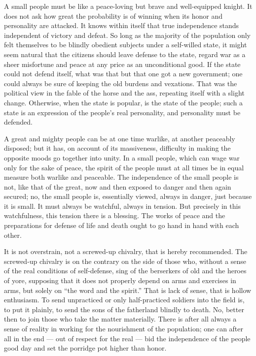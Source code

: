 \documentclass[12pt,a4paper,openany]{book}
\newcommand{\opage}[1]{\marginnote{\footnotesize\textit{[#1]}}}
\begin{document}
A small people must be like a peace-loving but
brave and well-equipped knight. It does not ask
how great the probability is of winning when its
honor and personality are attacked. It knows within itself
that true independence stands independent of victory
and defeat. So long as the majority of the population only
felt themselves to be blindly obedient subjects under a
self-willed state, it might seem natural that the citizens
\setcounter{footnote}{0}%
\opage{142}should leave defense to the state, regard war as a
sheer misfortune and peace at any price as an unconditional
good. If the state could not defend itself, what was
that but that one got a new government; one
could always be sure of keeping the old burdens
and vexations. That was the political view
in the fable of the horse and the ass, repeating itself with a
slight change. Otherwise, when the state is popular, is
the state of the people; such a state is an expression of the people's
real personality, and personality must be defended.


A great and mighty people can be at one time warlike,
at another peaceably disposed; but it has, on account of its
massiveness, difficulty in making the opposite moods
go together into unity. In a small
people, which can wage war only for the sake of peace, the spirit
of the people must at all times be in equal measure both
warlike and peaceable. The independence of the small people
is not, like that of the great, now and then exposed to
danger and then again secured; no, the small people is,
essentially viewed, always in danger, just because it is small. It
must always be watchful, always in tension. But
precisely in this watchfulness, this tension there is
a blessing. The works of peace and the preparations
for defense of life and death ought to go hand in hand
with each other.

It is not overstrain, not a screwed-up chivalry,
that is hereby recommended. The screwed-up chivalry
is on the contrary on the side of those who, without a sense
of the real conditions of self-defense, sing of the berserkers of old
and the heroes of yore, supposing that it does not properly
depend on arms and exercises in arms, but
\setcounter{footnote}{0}%
\opage{143}solely on ``the word and the spirit.'' That is lack of sense, that %
is hollow enthusiasm. To send unpracticed or only
half-practiced soldiers into the field is, to put it plainly, to
send the sons of the fatherland blindly to death. No, better then
to join those who take the matter materially.
There is after all always a sense of reality in working for
the nourishment of the population; one can after all in the end --- out of respect
for the real --- bid the independence of the people good day
and set the porridge pot higher than honor.
\end{document}
